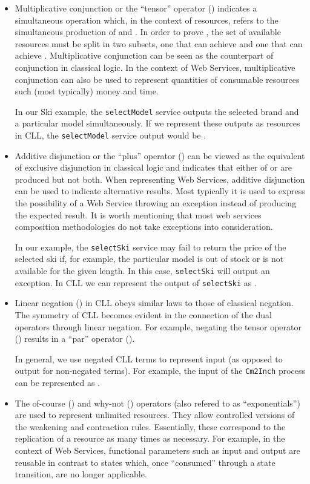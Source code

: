 \documentclass[copyright,creativecommons]{eptcs}
\begin{document}
\begin{itemize}

\item Multiplicative conjunction or the ``tensor'' operator () indicates a simultaneous operation which, in the context of resources, refers to the simultaneous production of  and . In order to prove , the set of available resources must be split in two subsets, one that can achieve  and one that can achieve . Multiplicative conjunction can be seen as the counterpart of conjunction in classical logic. In the context of Web Services, multiplicative conjunction can also be used to represent quantities of consumable resources such (most typically) money and time. 

In our Ski example, the \texttt{selectModel} service outputs the selected brand and a particular model simultaneously. If we represent these outputs as resources in CLL, the \texttt{selectModel} service output would be .

\item Additive disjunction or the ``plus'' operator () can be viewed as the equivalent of exclusive disjunction in classical logic and indicates that either of  or  are produced but not both. When representing Web Services, additive disjunction can be used to indicate alternative results. Most typically it is used to express the possibility of a Web Service throwing an exception instead of producing the expected result. It is worth mentioning that most web services composition methodologies do not take exceptions into consideration.


In our example, the \texttt{selectSki} service may fail to return the price of the selected ski if, for example, the particular model is out of stock or is not available for the given length. In this case, \texttt{selectSki} will output an exception. In CLL we can represent the output of \texttt{selectSki} as .

\item Linear negation () in CLL obeys similar laws to those of classical negation. The symmetry of CLL becomes evident in the connection of the dual operators through linear negation. For example, negating the tensor operator () results in a ``par'' operator ().

In general, we use negated CLL terms to represent input (as opposed to output for non-negated terms). For example, the input of the \texttt{Cm2Inch} process can be represented as .

\item The of-course () and why-not () operators (also refered to as ``exponentials'') are used to represent unlimited resources. They allow controlled versions of the weakening and contraction rules. Essentially, these correspond to the replication of a resource as many times as necessary. For example, in the context of Web Services, functional parameters such as input and output are reusable in contrast to states which, once ``consumed'' through a state transition, are no longer applicable. 
\end{itemize}
\end{document}
